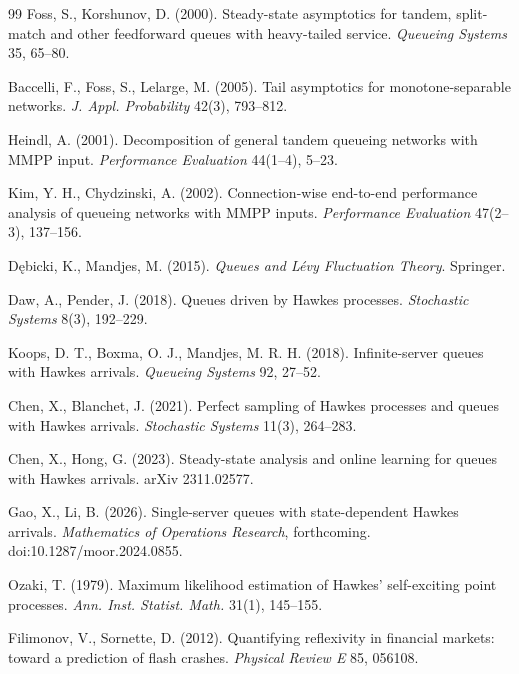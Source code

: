 \documentclass[11pt]{article}
\begin{document}
\begin{thebibliography}{99}
Foss, S., Korshunov, D. (2000). Steady-state asymptotics for tandem, split-match and other
feedforward queues with heavy-tailed service. \textit{Queueing Systems} 35, 65--80.

Baccelli, F., Foss, S., Lelarge, M. (2005). Tail asymptotics for monotone-separable
networks. \textit{J. Appl. Probability} 42(3), 793--812.

Heindl, A. (2001). Decomposition of general tandem queueing networks with MMPP input.
\textit{Performance Evaluation} 44(1--4), 5--23.

Kim, Y. H., Chydzinski, A. (2002). Connection-wise end-to-end performance analysis of
queueing networks with MMPP inputs. \textit{Performance Evaluation} 47(2--3), 137--156.

D\k{e}bicki, K., Mandjes, M. (2015). \textit{Queues and Lévy Fluctuation Theory}.
Springer.

Daw, A., Pender, J. (2018). Queues driven by Hawkes processes. \textit{Stochastic Systems}
8(3), 192--229.

Koops, D. T., Boxma, O. J., Mandjes, M. R. H. (2018). Infinite-server queues with Hawkes
arrivals. \textit{Queueing Systems} 92, 27--52.

Chen, X., Blanchet, J. (2021). Perfect sampling of Hawkes processes and queues with Hawkes
arrivals. \textit{Stochastic Systems} 11(3), 264--283.

Chen, X., Hong, G. (2023). Steady-state analysis and online learning for queues with
Hawkes arrivals. arXiv 2311.02577.

Gao, X., Li, B. (2026). Single-server queues with state-dependent Hawkes arrivals.
\textit{Mathematics of Operations Research}, forthcoming. doi:10.1287/moor.2024.0855.

Ozaki, T. (1979). Maximum likelihood estimation of Hawkes' self-exciting point processes.
\textit{Ann. Inst. Statist. Math.} 31(1), 145--155.

Filimonov, V., Sornette, D. (2012). Quantifying reflexivity in financial markets: toward a
prediction of flash crashes. \textit{Physical Review E} 85, 056108.


\end{thebibliography}
\end{document}
